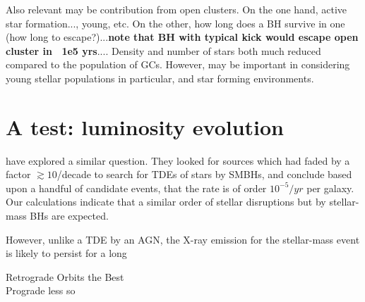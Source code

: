 Also relevant may be contribution from open clusters.  On the one hand, active star formation..., young, etc.  On the other, how long does a BH survive in one (how long to escape?)...{\bf note that BH with typical kick would escape open cluster in ~1e5 yrs}....  Density and number of stars both much reduced compared to the population of GCs.  However, may be important in considering young stellar populations in particular, and star forming environments.



\section{A test: luminosity evolution}

\citet{Khabibullin_2014} have explored a similar question.  They looked for sources which had faded by a factor $\gtrsim 10$/decade to search for TDEs of stars by SMBHs, and conclude based upon a handful of candidate events, that the rate is of order $10^{-5}/yr$ per galaxy.  Our calculations indicate that a similar order of stellar disruptions but by stellar-mass BHs are expected.   

However, unlike a TDE by an AGN, the X-ray emission for the stellar-mass event is likely to persist for a long





Retrograde Orbits the Best\\
Prograde less so
